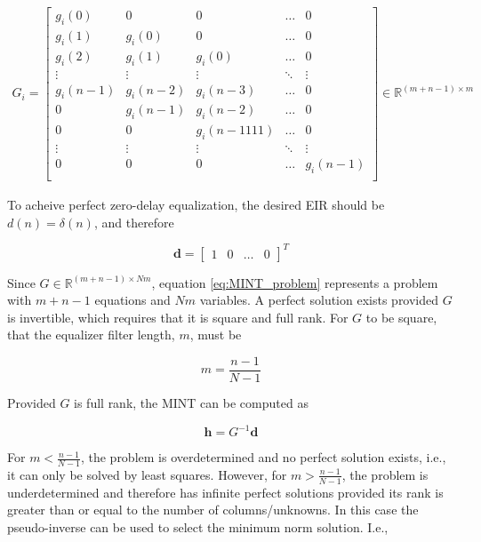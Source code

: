 \begin{eqnarray}
	G_i = 
	\begin{bmatrix} 
		g_i(0)     & 0           & 0              & \dots    & 0  \\
		g_i(1)     & g_i(0)    & 0              & \dots    & 0  \\
		g_i(2)    & g_i(1)     & g_i(0)      & \dots    & 0  \\
		\vdots    & \vdots    & \vdots     & \ddots & \vdots  \\
		g_i(n-1) & g_i(n-2) & g_i(n-3) & \dots   & 0 \\
		0            & g_i(n-1)  & g_i(n-2) & \dots   & 0 \\
		0            & 0             & g_i(n-1
		111) & \dots   & 0 \\
		\vdots    & \vdots    & \vdots     & \ddots & \vdots  \\
		0            & 0             & 0             & \dots   & g_i(n-1) \\
	\end{bmatrix} 
	\in \mathbb{R}^{(m+n-1)\times m}
\end{eqnarray}

\noindent
To acheive perfect zero-delay equalization, the desired EIR should be $d(n)=\delta(n)$, and therefore

\begin{equation}
	\boldsymbol{d} =
		\begin{bmatrix}
			1 & 0 & \dots & 0
		\end{bmatrix}^T
\end{equation}

Since $G \in \mathbb{R}^{(m+n-1)\times Nm}$, equation \ref{eq:MINT_problem} represents a problem with $m+n-1$ equations and $Nm$ variables. A perfect solution exists provided $G$ is invertible, which requires that it is square and full rank. For $G$ to be square, that the equalizer filter length, $m$, must be

\begin{equation}
	m = \frac{n-1}{N-1}
\end{equation}

\noindent
Provided $G$ is full rank, the MINT can be computed as

\begin{equation}
	\boldsymbol{h} = G^{-1}\boldsymbol{d}
\end{equation}

For $m < \frac{n-1}{N-1}$, the problem is overdetermined and no perfect solution exists, i.e., it can only be solved by least squares. However, for $m > \frac{n-1}{N-1}$, the problem is underdetermined and therefore has infinite perfect solutions provided its rank is greater than or equal to the number of columns/unknowns. In this case the pseudo-inverse can be used to select the minimum norm solution. I.e.,

